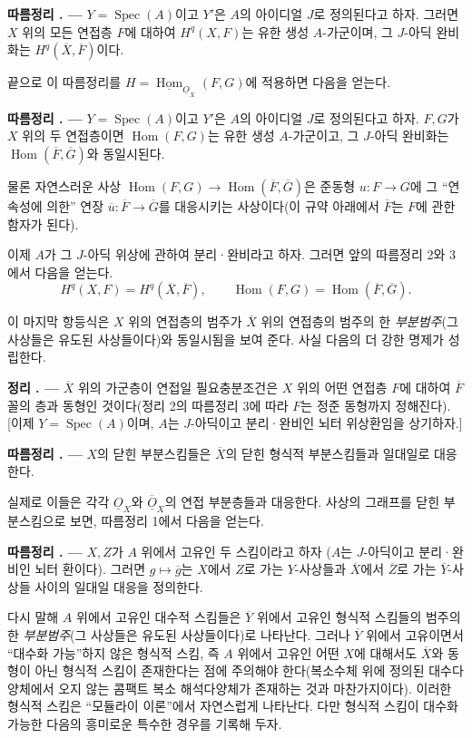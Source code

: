 \documentclass[11pt,twoside,openany]{book}
\numberwithin{equation}{section}
\newcommand{\sourceunit}{front}
\newcommand{\src}[1]{%
  \phantomsection\hypertarget{src:\sourceunit:#1}{}%
  \marginpar{\raggedleft\footnotesize\sffamily #1}%
}
\newcommand{\Osh}{\underline{O}}
\newcommand{\Homsh}{\underline{\operatorname{Hom}}}
\theoremstyle{plain}
\theoremstyle{definition}
\theoremstyle{remark}
\newcommand{\result}[2]{%
  \par\medskip\noindent\textbf{#1%
  \if\relax\detokenize{#2}\relax\else\space#2\fi. ---}\enspace
}
\begin{document}
\result{따름정리}{2} $Y=\operatorname{Spec}(A)$이고 $Y'$은 $A$의 아이디얼
$J$로 정의된다고 하자. 그러면 $X$ 위의 모든 연접층 $F$에 대하여
$H^{q}(X,F)$는 유한 생성 $A$-가군이며, 그 $J$-아딕 완비화는
$H^{q}(\overline X,\overline F)$이다.

끝으로 이 따름정리를
$H=\Homsh_{\Osh_X}(F,G)$에 적용하면 다음을 얻는다.

\result{따름정리}{3} $Y=\operatorname{Spec}(A)$이고 $Y'$은 $A$의 아이디얼
$J$로 정의된다고 하자. $F,G$가 $X$ 위의 두 연접층이면
$\operatorname{Hom}(F,G)$는 유한 생성 $A$-가군이고, 그 $J$-아딕
완비화는 $\operatorname{Hom}(\overline F,\overline G)$와 동일시된다.

물론 자연스러운 사상
$\operatorname{Hom}(F,G)\longrightarrow
\operatorname{Hom}(\overline F,\overline G)$은 준동형
$u:F\longrightarrow G$에 그 ``연속성에 의한'' 연장
$\overline u:\overline F\longrightarrow\overline G$를 대응시키는
사상이다(이 규약 아래에서 $\overline F$는 $F$에 관한 함자가 된다).

이제 $A$가 그 $J$-아딕 위상에 관하여 분리·완비라고 하자. 그러면 앞의
따름정리 2와 3에서 다음을 얻는다.
\[
  H^{q}(X,F)=H^{q}(\overline X,\overline F),
  \qquad
  \operatorname{Hom}(F,G)
  =\operatorname{Hom}(\overline F,\overline G).
\]

\src{198}
이 마지막 항등식은 $X$ 위의 연접층의 범주가 $\overline X$ 위의 연접층의
범주의 한 \emph{부분범주}(그 사상들은 유도된 사상들이다)와 동일시됨을
보여 준다. 사실 다음의 더 강한 명제가 성립한다.

\result{정리}{3} $\overline X$ 위의 가군층이 연접일 필요충분조건은
$X$ 위의 어떤 연접층 $F$에 대하여 $\overline F$ 꼴의 층과 동형인
것이다(정리 2의 따름정리 3에 따라 $F$는 정준 동형까지 정해진다).
[이제 $Y=\operatorname{Spec}(A)$이며, $A$는 $J$-아딕이고 분리·완비인
뇌터 위상환임을 상기하자.]

\result{따름정리}{1} $X$의 닫힌 부분스킴들은 $\overline X$의 닫힌 형식적
부분스킴들과 일대일로 대응한다.

실제로 이들은 각각 $\Osh_X$와 $\overline{\Osh}_X$의 연접 부분층들과
대응한다. 사상의 그래프를 닫힌 부분스킴으로 보면, 따름정리 1에서 다음을
얻는다.

\result{따름정리}{2} $X,Z$가 $A$ 위에서 고유인 두 스킴이라고 하자
($A$는 $J$-아딕이고 분리·완비인 뇌터 환이다). 그러면
$g\longmapsto\overline g$는 $X$에서 $Z$로 가는 $Y$-사상들과
$\overline X$에서 $\overline Z$로 가는 $\overline Y$-사상들 사이의
일대일 대응을 정의한다.

다시 말해 $A$ 위에서 고유인 대수적 스킴들은 $\overline Y$ 위에서 고유인
형식적 스킴들의 범주의 한 \emph{부분범주}(그 사상들은 유도된 사상들이다)로
나타난다. 그러나 $\overline Y$ 위에서 고유이면서 ``대수화 가능''하지
않은 형식적 스킴, 즉 $A$ 위에서 고유인 어떤 $X$에 대해서도 $\overline X$와
동형이 아닌 형식적 스킴이 존재한다는 점에 주의해야 한다(복소수체 위에
정의된 대수다양체에서 오지 않는 콤팩트 복소 해석다양체가 존재하는 것과
마찬가지이다). 이러한 형식적 스킴은 ``모듈라이 이론''에서 자연스럽게
나타난다. 다만 형식적 스킴이 대수화 가능한 다음의 흥미로운 특수한 경우를
기록해 두자.
\end{document}
